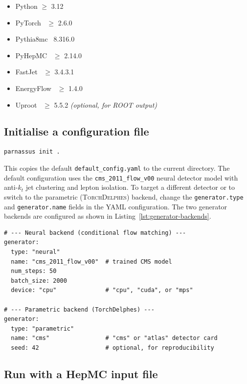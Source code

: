 \documentclass[11pt,a4paper]{article}          %
\begin{document}
\begin{itemize}
  \item Python $\geq$ 3.12
  \item PyTorch~\cite{pytorch} $\geq$ 2.6.0
  \item Pythia8mc~\cite{pythia8} 8.316.0
  \item PyHepMC~\cite{hepmc3} $\geq$ 2.14.0
  \item FastJet~\cite{fastjet} $\geq$ 3.4.3.1
  \item EnergyFlow~\cite{energyflow} $\geq$ 1.4.0
  \item Uproot~\cite{uproot} $\geq$ 5.5.2 \emph{(optional, for ROOT output)}
\end{itemize}

\subsection{Initialise a configuration file}

\begin{lstlisting}[style=bash]
parnassus init .
\end{lstlisting}

This copies the default \texttt{default\_config.yaml} to the current directory.
The default configuration uses the \texttt{cms\_2011\_flow\_v00} neural
detector model with anti-$k_t$ jet clustering and lepton isolation. To target
a different detector or to switch to the parametric
(\textsc{TorchDelphes}) backend, change the \texttt{generator.type} and
\texttt{generator.name} fields in the YAML configuration. The two generator
backends are configured as shown in Listing~\ref{lst:generator-backends}.

\begin{lstlisting}[style=yaml,caption={Switching between the neural and
parametric (\textsc{TorchDelphes}) generator backends.},
label=lst:generator-backends]
# --- Neural backend (conditional flow matching) ---
generator:
  type: "neural"
  name: "cms_2011_flow_v00"  # trained CMS model
  num_steps: 50
  batch_size: 2000
  device: "cpu"              # "cpu", "cuda", or "mps"

# --- Parametric backend (TorchDelphes) ---
generator:
  type: "parametric"
  name: "cms"                # "cms" or "atlas" detector card
  seed: 42                   # optional, for reproducibility
\end{lstlisting}

\subsection{Run with a HepMC input file}
\end{document}
